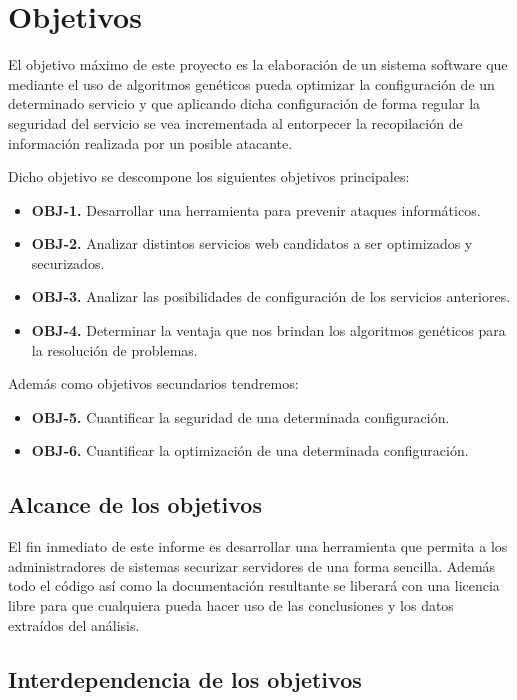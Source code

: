 \chapter{Objetivos}

El objetivo máximo de este proyecto es la elaboración de un sistema software que mediante el uso de algoritmos genéticos pueda optimizar la configuración de un determinado servicio y que aplicando dicha configuración de forma regular la seguridad del servicio se vea incrementada al entorpecer la recopilación de información realizada por un posible atacante.

\bigskip
Dicho objetivo se descompone los siguientes objetivos principales:

\begin{itemize}
  \item \textbf{OBJ-1.} Desarrollar una herramienta para prevenir ataques informáticos.
  \item \textbf{OBJ-2.} Analizar distintos servicios web candidatos a ser optimizados y securizados.
  \item \textbf{OBJ-3.} Analizar las posibilidades de configuración de los servicios anteriores.
  \item \textbf{OBJ-4.} Determinar la ventaja que nos brindan los algoritmos genéticos para la resolución de problemas.
\end{itemize}

Además como objetivos secundarios tendremos:

\begin{itemize}
  \item \textbf{OBJ-5.} Cuantificar la seguridad de una determinada configuración.
  \item \textbf{OBJ-6.} Cuantificar la optimización de una determinada configuración.
\end{itemize}


\section{Alcance de los objetivos}
El fin inmediato de este informe es desarrollar una herramienta que permita a los administradores de sistemas securizar servidores de una forma sencilla.
Además todo el código así como la documentación resultante se liberará con una licencia libre para que cualquiera pueda hacer uso de las conclusiones y los datos extraídos del análisis.

\section{Interdependencia de los objetivos}

